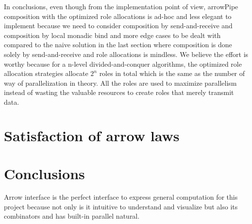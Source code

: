 In conclusions, even though from the implementation point of view, arrowPipe composition with the optimized role allocations is ad-hoc and less elegant to implement because we need to consider composition by send-and-receive and composition by local monadic bind and more edge cases to be dealt with compared to the naive solution in the last section where composition is done solely by send-and-receive and role allocations is mindless. We believe the effort is worthy because for a n-level divided-and-conquer algorithms, the optimized role allocation strategies allocate $2^n$ roles in total which is the same as the number of way of parallelization in theory. All the roles are used to maximize parallelism instead of wasting the valuable resources to create roles that merely transmit data.
\section{Satisfaction of arrow laws}
% 

\section{Conclusions}
Arrow interface is the perfect interface to express general computation for this project because not only is it intuitive to understand and visualize but also its combinators \hask{***} and \hask{&&&} has built-in parallel natural.

